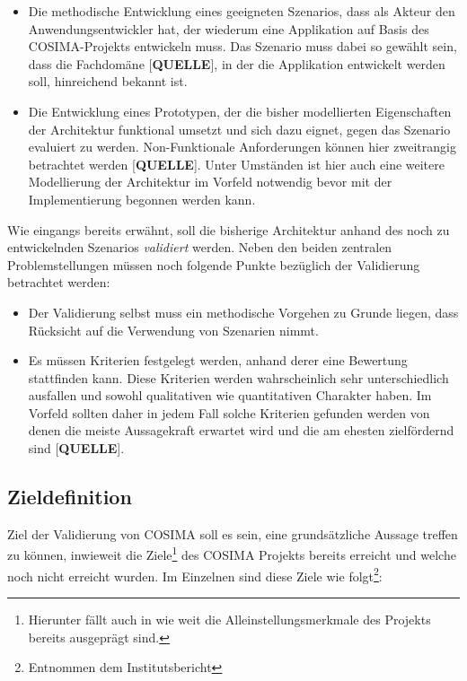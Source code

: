   \begin{itemize}
    \item Die methodische Entwicklung eines geeigneten Szenarios, dass als Akteur den Anwendungsentwickler hat, der wiederum eine Applikation auf Basis des COSIMA-Projekts entwickeln muss. Das Szenario muss dabei so gewählt sein, dass die Fachdomäne [\textbf{QUELLE}], in der die Applikation entwickelt werden soll, hinreichend bekannt ist.
    \item Die Entwicklung eines Prototypen, der die bisher modellierten Eigenschaften der Architektur funktional umsetzt und sich dazu eignet, gegen das Szenario evaluiert zu werden. Non-Funktionale Anforderungen können hier zweitrangig betrachtet werden [\textbf{QUELLE}]. Unter Umständen ist hier auch eine weitere Modellierung der Architektur im Vorfeld notwendig bevor mit der Implementierung begonnen werden kann.
  \end{itemize}

  Wie eingangs bereits erwähnt, soll die bisherige Architektur anhand des noch zu entwickelnden Szenarios \emph{validiert} werden. Neben den beiden zentralen Problemstellungen müssen noch folgende Punkte bezüglich der Validierung betrachtet werden:

  \begin{itemize}
    \item Der Validierung selbst muss ein methodische Vorgehen zu Grunde liegen, dass Rücksicht auf die Verwendung von Szenarien nimmt.
    \item Es müssen Kriterien festgelegt werden, anhand derer eine Bewertung stattfinden kann. Diese Kriterien werden wahrscheinlich sehr unterschiedlich ausfallen und sowohl qualitativen wie quantitativen Charakter haben. Im Vorfeld sollten daher in jedem Fall solche Kriterien gefunden werden von denen die meiste Aussagekraft erwartet wird und die am ehesten zielfördernd sind [\textbf{QUELLE}].
  \end{itemize}


\subsection{Zieldefinition} %
\label{ssec:zieldefinition}

  Ziel der Validierung von COSIMA soll es sein, eine grundsätzliche Aussage treffen zu können, inwieweit die Ziele\footnote{Hierunter fällt auch in wie weit die Alleinstellungsmerkmale des Projekts bereits ausgeprägt sind.} des COSIMA Projekts bereits erreicht und welche noch nicht erreicht wurden. Im Einzelnen sind diese Ziele wie folgt\footnote{Entnommen dem Institutsbericht}:
  
